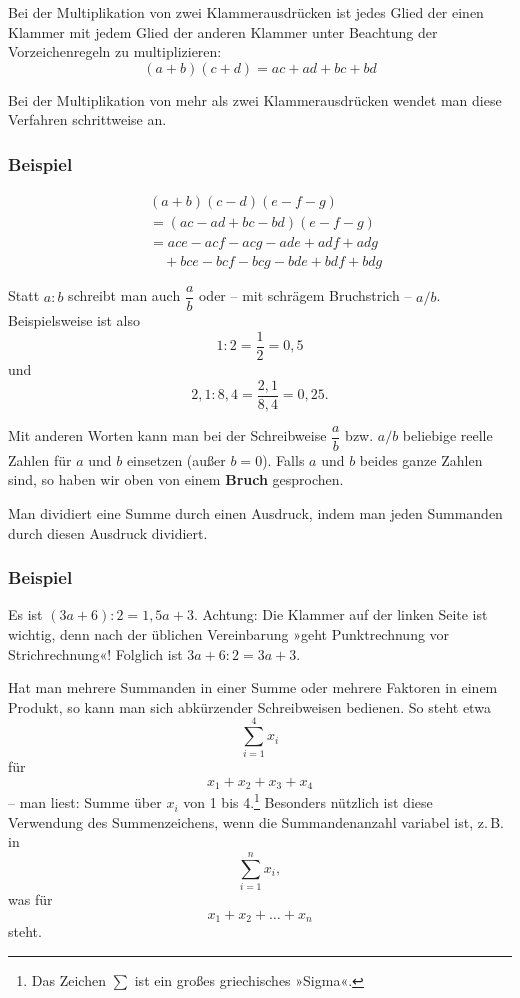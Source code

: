 Bei der Multiplikation von zwei Klammerausdrücken ist jedes Glied der einen Klammer mit jedem Glied der anderen Klammer unter Beachtung der Vorzeichenregeln zu multiplizieren:
\[ (a+b)(c+d) = ac + ad + bc + bd \]

Bei der Multiplikation von mehr als zwei Klammerausdrücken wendet man diese Verfahren schrittweise an.

\subsubsection{Beispiel}

\begin{align*}
  &(a+b)(c-d)(e-f-g)\\
  &= (ac - ad + bc - bd)(e-f-g)\\
  &= ace - acf - acg - ade + adf + adg\\
  &\quad + bce - bcf - bcg - bde + bdf + bdg
\end{align*}\beispielende


Statt $a : b$ schreibt man auch $\dfrac{a}{b}$ oder -- mit schrägem Bruchstrich -- $a/b$. Beispielsweise ist also
\[ 1 : 2 = \frac{1}{2} = 0{,}5 \]
und
\[ 2{,}1 : 8{,}4 = \frac{2{,}1}{8{,}4} = 0{,}25 . \]

Mit anderen Worten kann man bei der Schreibweise $\dfrac{a}{b}$ bzw. $a/b$ beliebige reelle Zahlen für $a$ und $b$ einsetzen (außer $b = 0$). Falls $a$ und $b$ beides ganze Zahlen sind, so haben wir oben von einem \textbf{Bruch} gesprochen.

Man dividiert eine Summe durch einen Ausdruck, indem man jeden Summanden durch diesen Ausdruck dividiert.

\subsubsection{Beispiel}

Es ist $(3a + 6) : 2 = 1{,}5a + 3$. Achtung: Die Klammer auf der linken Seite ist wichtig, denn nach der üblichen Vereinbarung »geht Punktrechnung vor Strichrechnung«! Folglich ist $3a + 6 : 2 = 3a + 3$.\beispielende


Hat man mehrere Summanden in einer Summe oder mehrere Faktoren in einem Produkt, so kann man sich abkürzender Schreibweisen bedienen. So steht etwa
\[ \sum_{i=1}^{4} x_i \]
für
\[ x_1 + x_2 + x_3 + x_4 \]
-- man liest: Summe über $x_i$ von 1 bis 4.\footnote{Das Zeichen $\sum$ ist ein großes griechisches »Sigma«.} Besonders nützlich ist diese Verwendung des Summenzeichens, wenn die Summandenanzahl variabel ist, z.\,B. in
\[ \sum_{i=1}^{n} x_i , \]
was für
\[ x_1 + x_2 + \ldots + x_n \]
steht.

